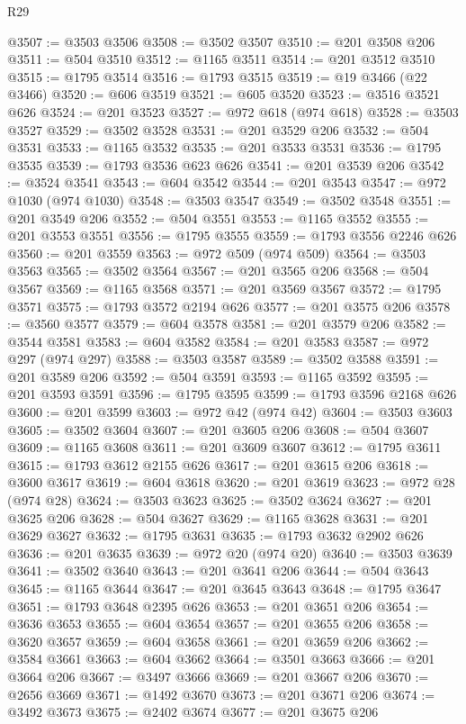 \begin{lexlean}{R29}
\begin{coremodule}
@3507 := @3503 @3506
@3508 := @3502 @3507
@3510 := @201 @3508 @206
@3511 := @504 @3510
@3512 := @1165 @3511
@3514 := @201 @3512 @3510
@3515 := @1795 @3514
@3516 := @1793 @3515
@3519 := @19 @3466 (@22 @3466)
@3520 := @606 @3519
@3521 := @605 @3520
@3523 := @3516 @3521 @626
@3524 := @201 @3523
@3527 := @972 @618 (@974 @618)
@3528 := @3503 @3527
@3529 := @3502 @3528
@3531 := @201 @3529 @206
@3532 := @504 @3531
@3533 := @1165 @3532
@3535 := @201 @3533 @3531
@3536 := @1795 @3535
@3539 := @1793 @3536 @623 @626
@3541 := @201 @3539 @206
@3542 := @3524 @3541
@3543 := @604 @3542
@3544 := @201 @3543
@3547 := @972 @1030 (@974 @1030)
@3548 := @3503 @3547
@3549 := @3502 @3548
@3551 := @201 @3549 @206
@3552 := @504 @3551
@3553 := @1165 @3552
@3555 := @201 @3553 @3551
@3556 := @1795 @3555
@3559 := @1793 @3556 @2246 @626
@3560 := @201 @3559
@3563 := @972 @509 (@974 @509)
@3564 := @3503 @3563
@3565 := @3502 @3564
@3567 := @201 @3565 @206
@3568 := @504 @3567
@3569 := @1165 @3568
@3571 := @201 @3569 @3567
@3572 := @1795 @3571
@3575 := @1793 @3572 @2194 @626
@3577 := @201 @3575 @206
@3578 := @3560 @3577
@3579 := @604 @3578
@3581 := @201 @3579 @206
@3582 := @3544 @3581
@3583 := @604 @3582
@3584 := @201 @3583
@3587 := @972 @297 (@974 @297)
@3588 := @3503 @3587
@3589 := @3502 @3588
@3591 := @201 @3589 @206
@3592 := @504 @3591
@3593 := @1165 @3592
@3595 := @201 @3593 @3591
@3596 := @1795 @3595
@3599 := @1793 @3596 @2168 @626
@3600 := @201 @3599
@3603 := @972 @42 (@974 @42)
@3604 := @3503 @3603
@3605 := @3502 @3604
@3607 := @201 @3605 @206
@3608 := @504 @3607
@3609 := @1165 @3608
@3611 := @201 @3609 @3607
@3612 := @1795 @3611
@3615 := @1793 @3612 @2155 @626
@3617 := @201 @3615 @206
@3618 := @3600 @3617
@3619 := @604 @3618
@3620 := @201 @3619
@3623 := @972 @28 (@974 @28)
@3624 := @3503 @3623
@3625 := @3502 @3624
@3627 := @201 @3625 @206
@3628 := @504 @3627
@3629 := @1165 @3628
@3631 := @201 @3629 @3627
@3632 := @1795 @3631
@3635 := @1793 @3632 @2902 @626
@3636 := @201 @3635
@3639 := @972 @20 (@974 @20)
@3640 := @3503 @3639
@3641 := @3502 @3640
@3643 := @201 @3641 @206
@3644 := @504 @3643
@3645 := @1165 @3644
@3647 := @201 @3645 @3643
@3648 := @1795 @3647
@3651 := @1793 @3648 @2395 @626
@3653 := @201 @3651 @206
@3654 := @3636 @3653
@3655 := @604 @3654
@3657 := @201 @3655 @206
@3658 := @3620 @3657
@3659 := @604 @3658
@3661 := @201 @3659 @206
@3662 := @3584 @3661
@3663 := @604 @3662
@3664 := @3501 @3663
@3666 := @201 @3664 @206
@3667 := @3497 @3666
@3669 := @201 @3667 @206
@3670 := @2656 @3669
@3671 := @1492 @3670
@3673 := @201 @3671 @206
@3674 := @3492 @3673
@3675 := @2402 @3674
@3677 := @201 @3675 @206

\end{coremodule}
\end{lexlean}
